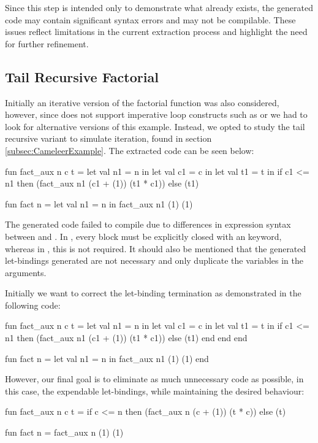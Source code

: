 Since this step is intended only to demonstrate what already exists, the generated code may contain significant syntax errors 
and may not be compilable. These issues reflect limitations in the current extraction process and highlight the need for 
further refinement.

\subsection{Tail Recursive Factorial}

Initially an iterative version of the factorial function was also considered, however, since \cml does not support imperative loop 
constructs such as  or  we had to look for alternative versions of this example. Instead, we opted 
to study the tail recursive variant to simulate iteration, found in section \ref{subsec:CameleerExample}. The extracted code can be seen below:

\begin{cakeml}
fun fact_aux n c t = let val n1 = n in
  let val c1 = c in
  let val t1 = t in
  if c1 <= n1 then (fact_aux n1 (c1 + (1)) (t1 * c1))  else (t1)

fun fact n = let val n1 = n in fact_aux n1 (1) (1)
\end{cakeml}

The generated \cml code failed to compile due to differences in  expression syntax between \ocaml and \cml. In \cml, every 
 block must be explicitly closed with an  keyword, whereas in \ocaml, this is not required. It should
also be mentioned that the generated let-bindings generated are not necessary and only duplicate the variables in the arguments.

Initially we want to correct the let-binding termination as demonstrated in the following code:

\begin{cakeml}
fun fact_aux n c t = let val n1 = n in
  let val c1 = c in
  let val t1 = t in
  if c1 <= n1 then (fact_aux n1 (c1 + (1)) (t1 * c1))  else (t1)
  end end end

fun fact n = let val n1 = n in fact_aux n1 (1) (1) end
\end{cakeml}

However, our final goal is to eliminate as much unnecessary code as possible, in this case, the expendable let-bindings, while 
maintaining the desired behaviour:

\begin{cakeml}
fun fact_aux n c t = 
  if c <= n then (fact_aux n (c + (1)) (t * c))  else (t)

fun fact n = fact_aux n (1) (1)
\end{cakeml}

